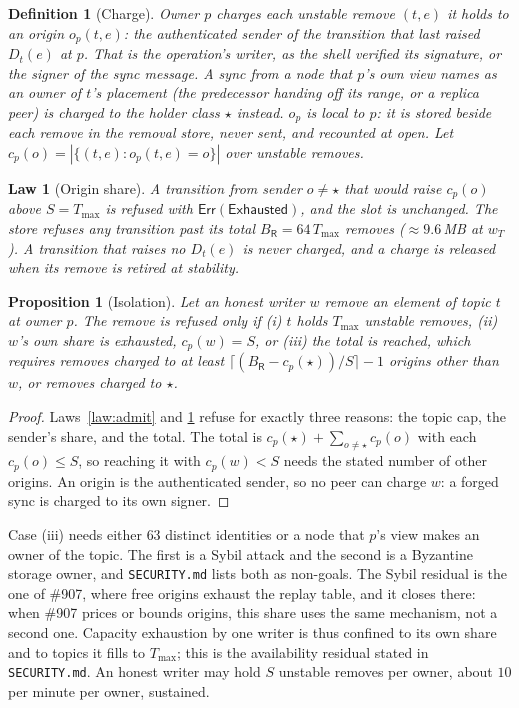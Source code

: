 \documentclass[journal]{IEEEtran}
\newtheorem{definition}{Definition}
\newtheorem{law}{Law}
\newtheorem{proposition}{Proposition}
\newcommand{\Err}{\mathsf{Err}}
\newcommand{\Exhausted}{\mathsf{Exhausted}}
\newcommand{\Rm}{\mathsf{R}}
\newcommand{\Tmax}{T_{\max}}
\newcommand{\issue}[1]{\#{#1}}
\begin{document}
\begin{definition}[Charge]\label{def:charge}
Owner $p$ charges each unstable remove $(t,e)$ it holds to an origin $o_p(t,e)$: the
authenticated sender of the transition that last raised $D_t(e)$ at $p$.  That is the
operation's writer, as the shell verified its signature, or the signer of the sync message.
A sync from a node that $p$'s own view names as an owner of $t$'s placement (the predecessor
handing off its range, or a replica peer) is charged to the \emph{holder class} $\star$
instead.  $o_p$ is local to $p$: it is stored beside each remove in the removal store, never
sent, and recounted at open.  Let $c_p(o)=|\{(t,e):o_p(t,e)=o\}|$ over unstable removes.
\end{definition}

\begin{law}[Origin share]\label{law:share}
A transition from sender $o\ne\star$ that would raise $c_p(o)$ above
$S=\Tmax$ is refused with $\Err(\Exhausted)$, and the slot is unchanged.  The store refuses
any transition past its total $B_\Rm=64\,\Tmax$ removes ($\approx9.6$\,MB at $w_T$).  A
transition that raises no $D_t(e)$ is never charged, and a charge is released when its remove
is retired at stability.
\end{law}

\begin{proposition}[Isolation]\label{prop:isolation}
Let an honest writer $w$ remove an element of topic $t$ at owner $p$.  The remove is refused
only if (i) $t$ holds $\Tmax$ unstable removes, (ii) $w$'s own share is exhausted,
$c_p(w)=S$, or (iii) the total is reached, which requires removes charged to at least
$\lceil(B_\Rm-c_p(\star))/S\rceil-1$ origins other than $w$, or removes charged to $\star$.
\end{proposition}
\begin{proof}
Laws~\ref{law:admit} and \ref{law:share} refuse for exactly three reasons: the topic cap, the
sender's share, and the total.  The total is
$c_p(\star)+\sum_{o\ne\star}c_p(o)$ with each $c_p(o)\le S$, so reaching it with
$c_p(w)<S$ needs the stated number of other origins.  An origin is the authenticated sender,
so no peer can charge $w$: a forged sync is charged to its own signer.
\end{proof}

Case (iii) needs either $63$ distinct identities or a node that $p$'s view makes an owner of
the topic.  The first is a Sybil attack and the second is a Byzantine storage owner, and
\texttt{SECURITY.md} lists both as non-goals.  The Sybil residual is the one of
\issue{907}, where free origins exhaust the replay table, and it closes there: when
\issue{907} prices or bounds origins, this share uses the same mechanism, not a second one.
Capacity exhaustion by one writer is thus
confined to its own share and to topics it fills to $\Tmax$; this is the availability residual
stated in \texttt{SECURITY.md}.  An honest writer may hold $S$ unstable removes per owner,
about $10$ per minute per owner, sustained.
\end{document}
